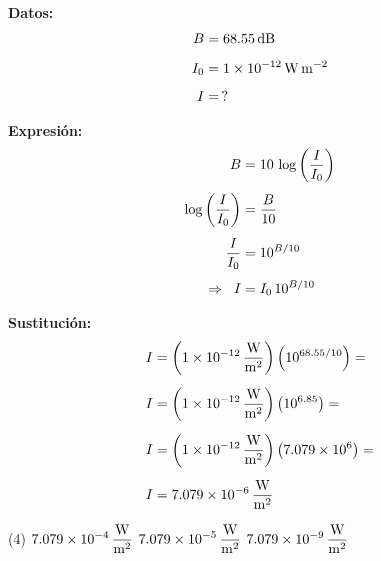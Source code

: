 \documentclass[12pt]{exam}
\begin{document}
\begin{questions}
    \vspace*{0.3cm}
    \begin{minipage}[t]{0.35\linewidth}
    \textbf{Datos: }
    \begin{align*}
    B &= \SI{68.55}{\dB} \\[0.5em]
    I_{0} &= \SI{1d-12}{\watt\per\square\meter} \\[0.5em]
    I &= \, ?
    \end{align*}
    \end{minipage}
    \hspace{1cm}
    \begin{minipage}[t]{0.4\linewidth}
    \textbf{Expresión:}
    \begin{align*}
    B &= 10 \, \log \left( \dfrac{I}{I_{0}} \right)\\[0.4em]
    \log \left( \dfrac{I}{I_{0}} \right) &= \dfrac{B}{10} \\[0.4em]
    \dfrac{I}{I_{0}} &= 10^{B/10} \\[0.4em] 
    \Rightarrow \hspace*{0.2cm} I &= I_{0} \, 10^{B/10}
    \end{align*}
    \end{minipage}

    \vspace*{0.3cm}
    \textbf{Sustitución:}
    \begin{align*}
    I &= \left( \SI[per-mode=fraction]{1d-12}{\watt\per\square\meter} \right) \left( 10^{68.55/10} \right) = \\[0.5em]
    I &= \left( \SI[per-mode=fraction]{1d-12}{\watt\per\square\meter} \right) \left( 10^{6.85} \right) = \\[0.5em]
    I &= \left( \SI[per-mode=fraction]{1d-12}{\watt\per\square\meter} \right) \left( \num{7.079d6} \right) = \\[0.5em]
    I &= \SI[per-mode=fraction]{7.079d-6}{\watt\per\square\meter}
    \end{align*}
    \begin{tasks}(4)
       \task $\displaystyle \SI[per-mode=fraction]{7.079d-4}{\watt\per\square\meter}$
       \task $\displaystyle \SI[per-mode=fraction]{7.079d-5}{\watt\per\square\meter}$
       \task {}
       \task $\displaystyle \SI[per-mode=fraction]{7.079d-9}{\watt\per\square\meter}$
    \end{tasks}



\end{questions}
\end{document}
